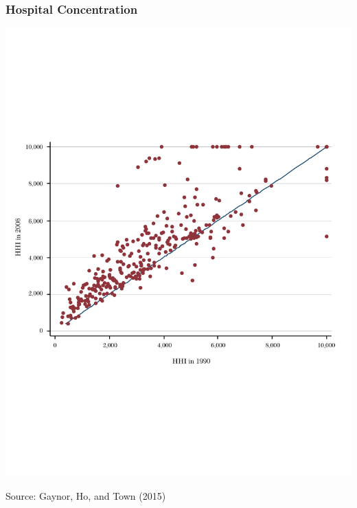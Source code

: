 \documentclass[ucs,9pt]{beamer}
\begin{document}
\begin{frame}
\frametitle{Hospital Concentration}
\begin{center}
\includegraphics[scale=0.5]{gay2}
\end{center}
\tiny Source: Gaynor, Ho, and Town (2015)
\end{frame}
\end{document}
